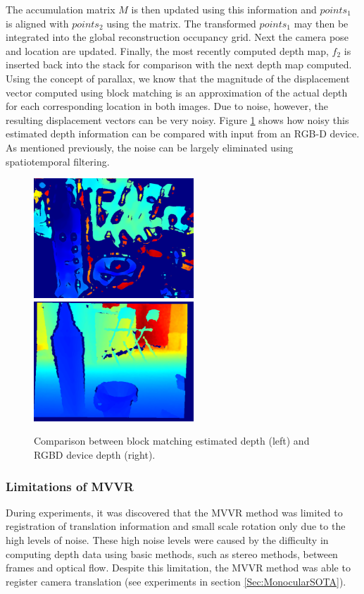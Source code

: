 The accumulation matrix $M$ is then updated using this information and $points_1$ is aligned with $points_2$ using the matrix. The transformed $points_1$ may then be integrated into the global reconstruction occupancy grid. Next the camera pose and location are updated. Finally, the most recently computed depth map, $f_2$ is inserted back into the stack for comparison with the next depth map computed. \\ 

Using the concept of parallax, we know that the magnitude of the displacement vector computed using block matching is an approximation of the actual depth for each corresponding location in both images. Due to noise, however, the resulting displacement vectors can be very noisy. Figure \ref{fig:DepthGenerationExample} shows how noisy this estimated depth information can be compared with input from an RGB-D device. As mentioned previously, the noise can be largely eliminated using spatiotemporal filtering. \\


\begin{figure}[!htb]
\centering
\includegraphics[width=6cm]{images/methodology/FVR/home_depth_frame_mono}
\includegraphics[width=6cm]{images/methodology/FVR/home_depth_frame}
\caption{Comparison between block matching estimated depth (left) and RGBD device depth (right).}
\label{fig:DepthGenerationExample}
\end{figure}
 
\subsubsection{Limitations of MVVR}

During experiments, it was discovered that the MVVR method was limited to registration of translation information and small scale rotation only due to the high levels of noise. These high noise levels  were caused by the difficulty in computing depth data using basic methods, such as stereo methods, between frames and optical flow. Despite this limitation, the MVVR method was able to register camera translation (see experiments in section \ref{Sec:MonocularSOTA}).  